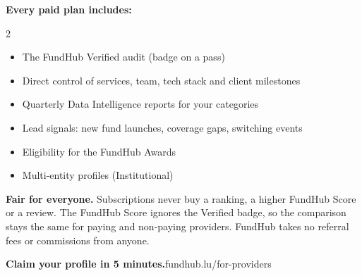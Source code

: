 \documentclass[10pt,a4paper]{article}
\begin{document}
\vspace{4pt}
\textbf{Every paid plan includes:}
\begin{multicols}{2}
\begin{itemize}
  \item The FundHub Verified audit (badge on a pass)
  \item Direct control of services, team, tech stack and client milestones
  \item Quarterly Data Intelligence reports for your categories
  \item Lead signals: new fund launches, coverage gaps, switching events
  \item Eligibility for the FundHub Awards
  \item Multi-entity profiles (Institutional)
\end{itemize}
\end{multicols}

\begin{tcolorbox}[colback=fhAmberLight, colframe=fhAmber, boxrule=0.6pt, arc=3pt]
  \textbf{Fair for everyone.} Subscriptions never buy a ranking, a higher FundHub Score or a review. The FundHub Score ignores the Verified badge, so the comparison stays the same for paying and non-paying providers. FundHub takes no referral fees or commissions from anyone.
\end{tcolorbox}

\vfill
\begin{fhdark}
  \textbf{Claim your profile in 5 minutes.}\hfill fundhub.lu/for-providers
\end{fhdark}
\end{document}

